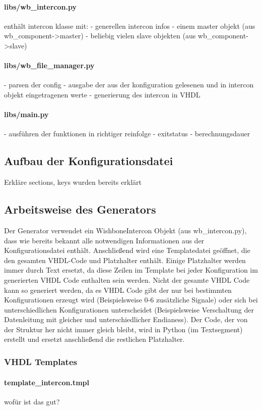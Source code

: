 \documentclass{article}
\begin{document}
\paragraph{libs/wb\_intercon.py} 
enthält intercon klasse mit:
- generellen intercon infos
- einem master objekt (aus wb\_component->master)
- beliebig vielen slave objekten (aus wb\_component->slave)
\paragraph{libs/wb\_file\_manager.py} 
- parsen der config
- ausgabe der aus der konfiguration gelesenen und in intercon objekt eingetragenen werte
- generierung des intercon in VHDL
\paragraph{libs/main.py} 
- ausführen der funktionen in richtiger reinfolge
- exitstatus
- berechnungsdauer
\subsection{Aufbau der Konfigurationsdatei}
Erkläre sections, keys wurden bereits erklärt
\subsection{Arbeitsweise des Generators}
Der Generator verwendet ein WishboneIntercon Objekt (aus wb\_intercon.py), dass wie bereits bekannt alle notwendigen Informationen aus der Konfigurationsdatei enthält. Anschließend wird eine Templatedatei geöffnet, die den gesamten VHDL-Code und Platzhalter enthält. Einige Platzhalter werden immer durch Text ersetzt, da diese Zeilen im Template bei jeder Konfiguration im generierten VHDL Code enthalten sein werden. Nicht der gesamte VHDL Code kann so generiert werden, da es VHDL Code gibt der nur bei bestimmten Konfigurationen erzeugt wird (Beispielsweise 0-6 zusätzliche Signale) oder sich bei unterschiedlichen Konfigurationen unterscheidet (Beispielsweise Verschaltung der Datenleitung mit gleicher und unterschiedlicher Endianess). Der Code, der von der Struktur her nicht immer gleich bleibt, wird in Python (im Textsegment) erstellt und ersetzt anschließend die restlichen Platzhalter.
\subsubsection{VHDL Templates}
\paragraph{template\_intercon.tmpl}
wofür ist das gut?
\end{document}
